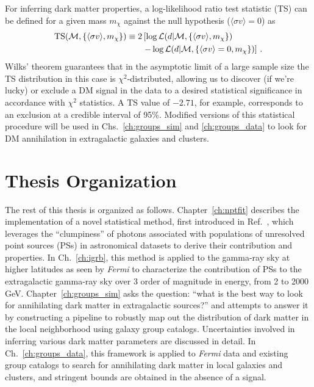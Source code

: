 For inferring dark matter properties, a log-likelihood ratio test statistic (TS) can be defined for a given mass $m_\chi$ against the null hypothesis ($\langle\sigma v\rangle=0$) as
\begin{equation}\begin{aligned}
{\rm TS}(\mathcal{M}, \{ \langle\sigma v\rangle, m_\chi\}) \equiv 2 &\left[ \log \mathcal{L}(d | \mathcal{M}, \{\langle\sigma v\rangle, m_\chi \}) \right.\\
&\left.- \log \mathcal{L}(d | \mathcal{M}, \{{\langle\sigma v\rangle=0}, m_\chi \}) \right]\,.
\label{eq:TSdef_darksky}
\end{aligned}\end{equation}
Wilks' theorem guarantees that in the asymptotic limit of a large sample size the TS distribution in this case is $\chi^2$-distributed, allowing us to discover (if we're lucky) or exclude a DM signal in the data to a desired statistical significance in accordance with $\chi^2$ statistics. A TS value of $-2.71$, for example, corresponds to an exclusion at a credible interval of 95\%. Modified versions of this statistical procedure will be used in Chs.~\ref{ch:groups_sim} and \ref{ch:groups_data} to look for DM annihilation in extragalactic galaxies and clusters.

\section{Thesis Organization}
\label{sec:summary}

The rest of this thesis is organized as follows. Chapter~\ref{ch:nptfit} describes the implementation of a novel statistical method, first introduced in Ref.~\cite{Lee:2015fea}, which leverages the ``clumpiness'' of photons associated with populations of unresolved point sources (PSs) in astronomical datasets to derive their contribution and properties. In Ch.~\ref{ch:igrb}, this method is applied to the gamma-ray sky at higher latitudes as seen by \emph{Fermi} to characterize the contribution of PSs to the extragalactic gamma-ray sky over 3 order of magnitude in energy, from 2 to 2000 GeV. Chapter~\ref{ch:groups_sim} asks the question: ``what is the best way to look for annihilating dark matter in extragalactic sources?'' and attempts to answer it by constructing a pipeline to robustly map out the distribution of dark matter in the local neighborhood using galaxy group catalogs. Uncertainties involved in inferring various dark matter parameters are discussed in detail. In Ch.~\ref{ch:groups_data}, this framework is applied to \emph{Fermi} data and existing group catalogs to search for annihilating dark matter in local galaxies and clusters, and stringent bounds are obtained in the absence of a signal. 


